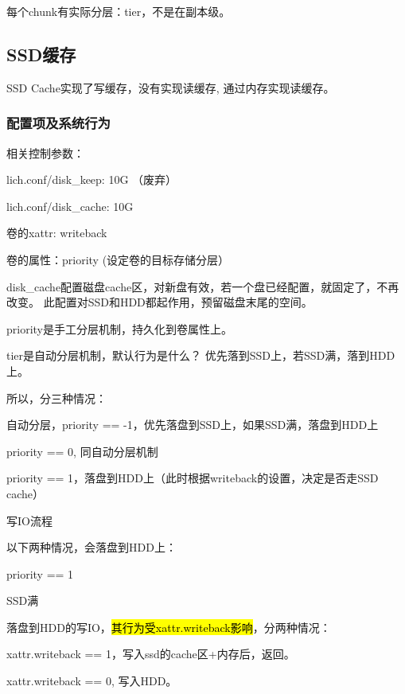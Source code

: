 每个chunk有实际分层：tier，不是在副本级。

\subsection{SSD缓存}

SSD Cache实现了写缓存，没有实现读缓存, 通过内存实现读缓存。

\subsubsection{配置项及系统行为}

相关控制参数：
\begin{enumbox}
\item lich.conf/disk\_keep: 10G （废弃）
\item lich.conf/disk\_cache: 10G
\item 卷的xattr: writeback
\item 卷的属性：priority (设定卷的目标存储分层）
\end{enumbox}

disk\_cache配置磁盘cache区，对新盘有效，若一个盘已经配置，就固定了，不再改变。
此配置对SSD和HDD都起作用，预留磁盘末尾的空间。

priority是手工分层机制，持久化到卷属性上。

tier是自动分层机制，默认行为是什么？ 优先落到SSD上，若SSD满，落到HDD上。

所以，分三种情况：
\begin{compactenum}
\item 自动分层，priority == -1，优先落盘到SSD上，如果SSD满，落盘到HDD上
\item priority == 0, 同自动分层机制
\item priority == 1，落盘到HDD上（此时根据writeback的设置，决定是否走SSD cache）
\end{compactenum}

写IO流程

以下两种情况，会落盘到HDD上：
\begin{compactenum}
\item priority == 1
\item SSD满
\end{compactenum}

落盘到HDD的写IO，\hl{其行为受xattr.writeback影响}，分两种情况：
\begin{compactenum}
\item xattr.writeback == 1，写入ssd的cache区+内存后，返回。
\item xattr.writeback == 0, 写入HDD。
\end{compactenum}

